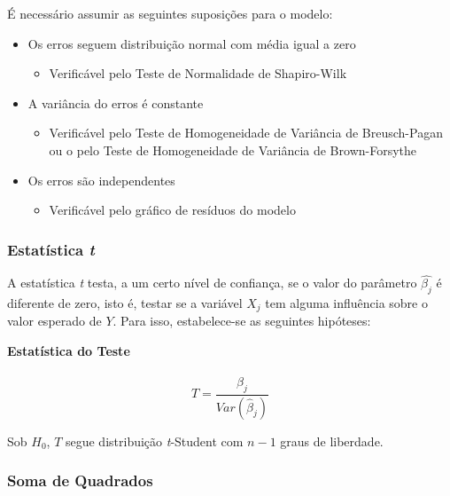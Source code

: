 \documentclass[
  portuguese,
]{estat/estat}
\providecommand{\tightlist}{%
  \setlength{\itemsep}{0pt}\setlength{\parskip}{0pt}}
\begin{document}
É necessário assumir as seguintes suposições para o modelo:

\begin{itemize}
\tightlist
\item
  Os erros seguem distribuição normal com média igual a zero

  \begin{itemize}
  \tightlist
  \item
    Verificável pelo Teste de Normalidade de Shapiro-Wilk
  \end{itemize}
\item
  A variância do erros é constante

  \begin{itemize}
  \tightlist
  \item
    Verificável pelo Teste de Homogeneidade de Variância de
    Breusch-Pagan ou o pelo Teste de Homogeneidade de Variância de
    Brown-Forsythe
  \end{itemize}
\item
  Os erros são independentes

  \begin{itemize}
  \tightlist
  \item
    Verificável pelo gráfico de resíduos do modelo
  \end{itemize}
\end{itemize}

\subsubsection{\texorpdfstring{Estatística
\emph{t}}{Estatística t}}\label{estatuxedstica-t}

A estatística \emph{t} testa, a um certo nível de confiança, se o valor
do parâmetro \(\hat{\beta_j}\) é diferente de zero, isto é, testar se a
variável \(X_j\) tem alguma influência sobre o valor esperado de \(Y\).
Para isso, estabelece-se as seguintes hipóteses:


\textbf{Estatística do Teste}

\[
T=\frac{\hat{\beta}_j}{Var(\hat{\beta}_j)}
\]

Sob \(H_0\), \(T\) segue distribuição \emph{t}-Student com \(n-1\) graus
de liberdade.

\subsubsection{Soma de Quadrados}\label{soma-de-quadrados}
\end{document}
